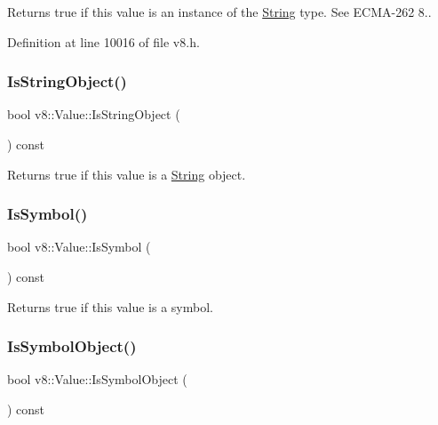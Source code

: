 Returns true if this value is an instance of the \mbox{\hyperlink{classv8_1_1String}{String}} type. See E\+C\+M\+A-\/262 8.. 

Definition at line 10016 of file v8.\+h.

\mbox{\label{classv8_1_1Value_a32054145eadf3b1a3f900dcd52110e2b}} 
\subsubsection{\texorpdfstring{Is\+String\+Object()}{IsStringObject()}}
{\footnotesize\ttfamily bool v8\+::\+Value\+::\+Is\+String\+Object (\begin{DoxyParamCaption}{ }\end{DoxyParamCaption}) const}

Returns true if this value is a \mbox{\hyperlink{classv8_1_1String}{String}} object. \mbox{\label{classv8_1_1Value_a0fee90dc2589b156d277a74b0b225a71}} 
\subsubsection{\texorpdfstring{Is\+Symbol()}{IsSymbol()}}
{\footnotesize\ttfamily bool v8\+::\+Value\+::\+Is\+Symbol (\begin{DoxyParamCaption}{ }\end{DoxyParamCaption}) const}

Returns true if this value is a symbol. \mbox{\label{classv8_1_1Value_a1d5507f09734f8062a0d0a9a78496b2a}} 
\subsubsection{\texorpdfstring{Is\+Symbol\+Object()}{IsSymbolObject()}}
{\footnotesize\ttfamily bool v8\+::\+Value\+::\+Is\+Symbol\+Object (\begin{DoxyParamCaption}{ }\end{DoxyParamCaption}) const}

